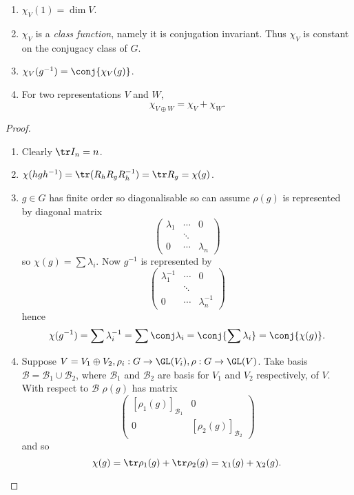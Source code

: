 \documentclass[a4paper]{article}
\theoremstyle{definition}
\begin{document}
\begin{theorem}\leavevmode
  \begin{enumerate}
  \item \(\chi_V(1) = \dim V\).
  \item \(\chi_V\) is a \emph{class function}, namely it is conjugation invariant. Thus \(\chi_V\) is constant on the conjugacy class of \(G\).
  \item \(\chi_V(g^{-1}) = \conj{\chi_V(g)}\).
  \item For two representations \(V\) and \(W\),
    \[
      \chi_{V \oplus W} = \chi_V + \chi_W.
    \]
  \end{enumerate}
\end{theorem}

\begin{proof}\leavevmode
  \begin{enumerate}
  \item Clearly \(\tr I_n = n\).
  \item \(\chi(hgh^{-1}) = \tr(R_hR_gR_h^{-1}) = \tr R_g = \chi(g)\).
  \item \(g \in G\) has finite order so diagonalisable so can assume \(\rho(g)\) is represented by diagonal matrix
    \[
      \begin{pmatrix}
        \lambda_1 & \cdots & 0 \\
        & \ddots \\
        0 & \cdots & \lambda_n
      \end{pmatrix}
    \]
    so \(\chi(g) = \sum \lambda_i\). Now \(g^{-1}\) is represented by
    \[
      \begin{pmatrix}
        \lambda_1^{-1} & \cdots & 0 \\
        & \ddots \\
        0 & \cdots & \lambda_n^{-1}
      \end{pmatrix}
    \] 
    hence
    \[
      \chi(g^{-1}) = \sum \lambda_i^{-1} = \sum \conj \lambda_i = \conj{\sum \lambda_i} = \conj{\chi(g)}.
    \]
  \item Suppose \(V = V_1 \oplus V_2, \rho_i: G \to \GL(V_i), \rho: G \to \GL(V)\). Take basis \(\mathcal B = \mathcal B_1 \cup \mathcal B_2\), where \(\mathcal B_1\) and \(\mathcal B_2\) are basis for \(V_1\) and \(V_2\) respectively, of \(V\). With respect to \(\mathcal B\) \(\rho(g)\) has matrix
    \[
      \begin{pmatrix}
        [\rho_1(g)]_{\mathcal B_1} & 0 \\
        0 & [\rho_2(g)]_{\mathcal B_2}
      \end{pmatrix}
    \]
    and so
    \[
      \chi(g) = \tr \rho_1(g) + \tr \rho_2(g) = \chi_1(g) + \chi_2(g).
    \]
  \end{enumerate}
\end{proof}
\end{document}
